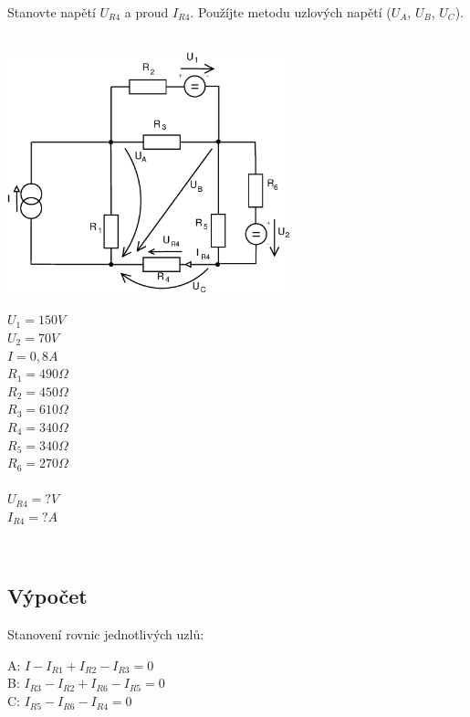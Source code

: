 \documentclass[12pt,a4paper,titlepage,final]{article}
\begin{document}
	Stanovte napětí $U_{R4}$ a proud $I_{R4}$. Použíjte metodu uzlových napětí
	($U_{A}$, $U_{B}$, $U_{C}$). \\
	\\
	\begin{minipage}[c]{0.5\textwidth}
		\includegraphics[height=7cm]{img/Pr3_2012.eps}
		\label{fig:pr3_obvod}
	\end{minipage}
	\begin{minipage}[c]{0.25\textwidth}
		$U_{1} = 150 V$ \\
		$U_{2} = 70 V$ \\
		$I = 0,8 A$ \\
		$R_{1} = 490 \Omega$ \\
		$R_{2} = 450 \Omega$ \\
		$R_{3} = 610 \Omega$ \\
		$R_{4} = 340 \Omega$ \\
		$R_{5} = 340 \Omega$ \\
		$R_{6} = 270 \Omega$ \\
		\\
		$U_{R4} = ? V$ \\
		$I_{R4} = ? A$
	\end{minipage}
	\\


	\subsection*{Výpočet}

	\quad Stanovení rovnic jednotlivých uzlů:
	
	\begin{tabbing}
		A: $I - I_{R1} + I_{R2} - I_{R3} = 0$ \\
		B: $I_{R3} - I_{R2} + I_{R6} - I_{R5} = 0$ \\
		C: $I_{R5} - I_{R6} - I_{R4} = 0$
	\end{tabbing}
	
\end{document}

